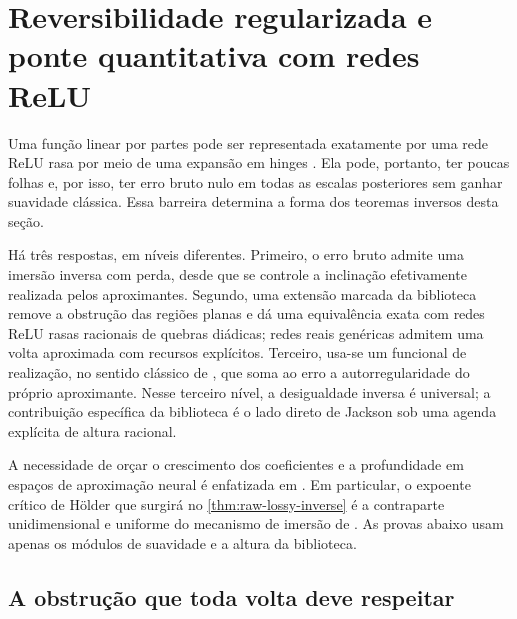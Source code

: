 \documentclass[11pt,a4paper]{article}
\theoremstyle{definition}
\theoremstyle{remark}
\begin{document}
\section{Reversibilidade regularizada e ponte quantitativa com redes ReLU}
\label{sec:regularized-reversibility}

Uma função linear por partes pode ser representada exatamente por uma rede ReLU
rasa por meio de uma expansão em hinges
\citep{devorehaninpetrova2021,daubechies2022}. Ela pode, portanto, ter poucas
folhas e, por isso, ter erro bruto nulo em todas as escalas posteriores sem
ganhar suavidade clássica. Essa barreira determina a forma dos teoremas
inversos desta seção.

Há três respostas, em níveis diferentes. Primeiro, o erro bruto admite uma
imersão inversa com perda, desde que se controle a inclinação efetivamente
realizada pelos aproximantes. Segundo, uma extensão marcada da biblioteca
remove a obstrução das regiões planas e dá uma equivalência exata com redes
ReLU rasas racionais de quebras diádicas; redes reais genéricas admitem uma
volta aproximada com recursos explícitos. Terceiro, usa-se um funcional de
realização, no sentido clássico de \citet{hristovivanov1990}, que soma ao erro
a autorregularidade do próprio aproximante. Nesse terceiro nível, a
desigualdade inversa é universal; a contribuição específica da biblioteca é o
lado direto de Jackson sob uma agenda explícita de altura racional.

A necessidade de orçar o crescimento dos coeficientes e a profundidade em
espaços de aproximação neural é enfatizada em
\citet{gribonval2022,grohs2023,guhringraslan2021}. Em particular, o expoente crítico de Hölder
que surgirá no \cref{thm:raw-lossy-inverse} é a contraparte unidimensional e
uniforme do mecanismo de imersão de \citet{grohs2023}. As provas abaixo usam
apenas os módulos de suavidade e a altura da biblioteca.

\subsection{A obstrução que toda volta deve respeitar}
\end{document}
